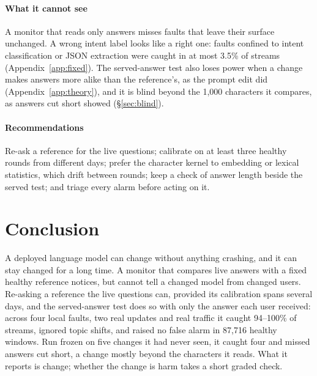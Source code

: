 \documentclass{article}
\begin{document}
\paragraph{What it cannot see} A monitor that reads only answers misses faults
that leave their surface unchanged. A wrong intent label looks like a right one:
faults confined to intent classification or JSON extraction were caught in at most
3.5\% of streams (Appendix~\ref{app:fixed}). The served-answer test also loses power
when a change makes answers more alike than the reference's, as the prompt edit
did (Appendix~\ref{app:theory}), and it is blind beyond the 1{,}000 characters it
compares, as answers cut short showed (\S\ref{sec:blind}).

\paragraph{Recommendations} Re-ask a reference for the live questions; calibrate
on at least three healthy rounds from different days; prefer the character kernel
to embedding or lexical statistics, which drift between rounds; keep a check of
answer length beside the served test; and triage every alarm before acting on it.

\section{Conclusion}
A deployed language model can change without anything crashing, and it can stay
changed for a long time. A monitor that compares live answers with a fixed healthy
reference notices, but cannot tell a changed model from changed users. Re-asking a
reference the live questions can, provided its calibration spans several days, and
the served-answer test does so with only the answer each user received: across four
local faults, two real updates and real traffic it caught 94--100\% of streams,
ignored topic shifts, and raised no false alarm in 87{,}716 healthy windows. Run
frozen on five changes it had never seen, it caught four and missed answers cut
short, a change mostly beyond the characters it reads. What it reports is change;
whether the change is harm takes a short graded check.
\end{document}
